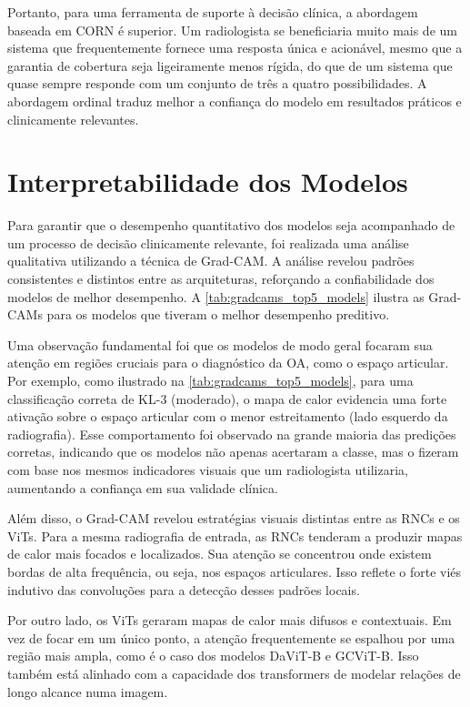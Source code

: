 Portanto, para uma ferramenta de suporte à decisão clínica, a abordagem baseada em CORN é superior. Um radiologista se beneficiaria muito mais de um sistema que frequentemente fornece uma resposta única e acionável, mesmo que a garantia de cobertura seja ligeiramente menos rígida, do que de um sistema que quase sempre responde com um conjunto de três a quatro possibilidades. A abordagem ordinal traduz melhor a confiança do modelo em resultados práticos e clinicamente relevantes.

\section{Interpretabilidade dos Modelos}

Para garantir que o desempenho quantitativo dos modelos seja acompanhado de um processo de decisão clinicamente relevante, foi realizada uma análise qualitativa utilizando a técnica de Grad-CAM. A análise revelou padrões consistentes e distintos entre as arquiteturas, reforçando a confiabilidade dos modelos de melhor desempenho. A \autoref{tab:gradcams_top5_models} ilustra as Grad-CAMs para os modelos que tiveram o melhor desempenho preditivo.

Uma observação fundamental foi que os modelos de modo geral focaram sua atenção em regiões cruciais para o diagnóstico da OA, como o espaço articular. Por exemplo, como ilustrado na \autoref{tab:gradcams_top5_models}, para uma classificação correta de KL-3 (moderado), o mapa de calor evidencia uma forte ativação sobre o espaço articular com o menor estreitamento (lado esquerdo da radiografia). Esse comportamento foi observado na grande maioria das predições corretas, indicando que os modelos não apenas acertaram a classe, mas o fizeram com base nos mesmos indicadores visuais que um radiologista utilizaria, aumentando a confiança em sua validade clínica.

Além disso, o Grad-CAM revelou estratégias visuais distintas entre as RNCs e os ViTs. Para a mesma radiografia de entrada, as RNCs tenderam a produzir mapas de calor mais focados e localizados. Sua atenção se concentrou onde existem bordas de alta frequência, ou seja, nos espaços articulares. Isso reflete o forte viés indutivo das convoluções para a detecção desses padrões locais.

Por outro lado, os ViTs geraram mapas de calor mais difusos e contextuais. Em vez de focar em um único ponto, a atenção frequentemente se espalhou por uma região mais ampla, como é o caso dos modelos DaViT-B e GCViT-B. Isso também está alinhado com a capacidade dos transformers de modelar relações de longo alcance numa imagem.

